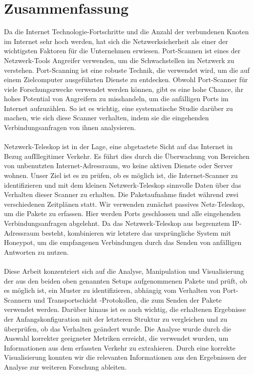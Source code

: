 \chapter*{Zusammenfassung}	
\thispagestyle{empty}
Da die Internet Technologie-Fortschritte und die Anzahl der verbundenen Knoten im Internet sehr hoch werden, hat sich die Netzwerksicherheit als einer der wichtigsten Faktoren für die Unternehmen erwiesen.
Port-Scannen ist eines der Netzwerk-Tools Angreifer verwenden, um die Schwachstellen im Netzwerk zu verstehen. 
Port-Scanning ist eine robuste Technik, die verwendet wird, um die auf einem Zielcomputer ausgeführten Dienste zu entdecken.
Obwohl Port-Scanner für viele Forschungszwecke verwendet werden können, gibt es eine hohe Chance, ihr hohes Potential von Angreifern zu misshandeln, um die anfälligen Ports im Internet aufzuzählen. 
So ist es wichtig, eine systematische Studie darüber zu machen, wie sich diese Scanner verhalten, indem sie die eingehenden Verbindungsanfragen von ihnen analysieren.\\\\
Netzwerk-Teleskop ist in der Lage, eine abgetastete Sicht auf das Internet in Bezug aufIllegitimer Verkehr.
Es führt dies durch die Überwachung von Bereichen von unbenutzten Internet-Adressraum, wo keine aktiven Dienste oder Server wohnen.
Unser Ziel ist es zu prüfen, ob es möglich ist, die Internet-Scanner zu identifizieren und mit dem kleinen Netzwerk-Teleskop sinnvolle Daten über das Verhalten dieser Scanner zu erhalten.
Die Paketaufnahme findet während zwei verschiedenen Zeitplänen statt.
Wir verwenden zunächst passives Netz-Teleskop, um die Pakete zu erfassen.
Hier werden Ports geschlossen und alle eingehenden Verbindungsanfragen abgelehnt.
Da das Netzwerk-Teleskop aus begrenztem IP-Adressraum besteht, kombinieren wir letztere das ursprüngliche System mit Honeypot, um die empfangenen Verbindungen durch das Senden von anfälligen Antworten zu nutzen.\\\\
Diese Arbeit konzentriert sich auf die Analyse, Manipulation und Visualisierung der aus den beiden oben genannten Setups aufgenommenen Pakete und prüft, ob es möglich ist, ein Muster zu identifizieren, abhängig vom Verhalten von Port-Scannern und Transportschicht -Protokollen, die zum Senden der Pakete verwendet werden.
Darüber hinaus ist es auch wichtig, die erhaltenen Ergebnisse der Anfangskonfiguration mit der letzteren Struktur zu vergleichen und zu überprüfen, ob das Verhalten geändert wurde.
Die Analyse wurde durch die Auswahl korrekter geeigneter Metriken erreicht, die verwendet wurden, um Informationen aus dem erfassten Verkehr zu extrahieren.
Durch eine korrekte Visualisierung konnten wir die relevanten Informationen aus den Ergebnissen der Analyse zur weiteren Forschung ableiten.